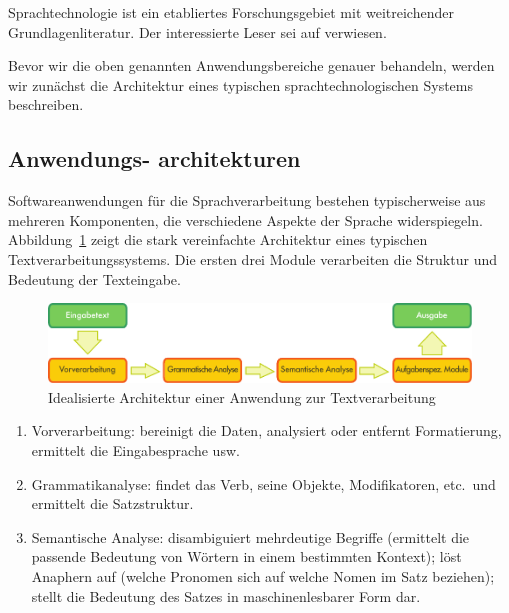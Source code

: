 \begin{multicols}{2}
Sprachtechnologie ist ein etabliertes Forschungsgebiet mit weitreichender Grundlagenliteratur. Der interessierte Leser sei auf \cite{carstensen-etal1, jurafsky-martin01, manning-schuetze1, lt-world1, lt-survey1} verwiesen.

Bevor wir die oben genannten Anwendungsbereiche genauer behandeln, werden wir zunächst die Architektur eines typischen sprachtechnologischen Systems beschreiben. 

\subsection[Anwendungsarchitekturen]{Anwendungs- architekturen}

Softwareanwendungen für die Sprachverarbeitung bestehen typischerweise aus mehreren Komponenten, die verschiedene Aspekte der Sprache widerspiegeln. Abbildung~\ref{fig:textprocessingarch_de} zeigt die stark vereinfachte Architektur eines typischen Textverarbeitungssystems. Die ersten drei Module verarbeiten die Struktur und Bedeutung der Texteingabe.

\begin{figure}[b]
  \center
 \includegraphics[width=\textwidth]{../_media/german/text_processing_app_architecture}
  \caption{Idealisierte Architektur einer Anwendung zur Textverarbeitung}
  \label{fig:textprocessingarch_de}
\end{figure}

\begin{enumerate}
\item Vorverarbeitung: bereinigt die Daten, analysiert oder entfernt Formatierung, ermittelt die Eingabesprache usw.
\item Grammatikanalyse: findet das Verb, seine Objekte, Modifikatoren, etc.~und ermittelt die Satzstruktur.
\item Semantische Analyse: disambiguiert mehrdeutige Begriffe (ermittelt die passende Bedeutung von Wörtern in einem bestimmten Kontext); löst Anaphern auf (welche Pronomen sich auf welche Nomen im Satz beziehen); stellt die Bedeutung des Satzes in maschinenlesbarer Form dar.
\end{enumerate}


\end{multicols}
